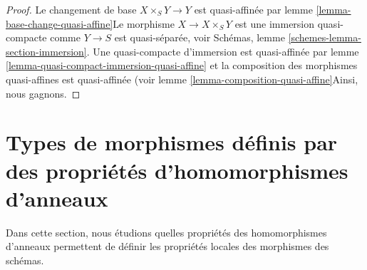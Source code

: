 \begin{proof}

Le changement de base $X \times_S Y \to Y$ est quasi-affinée par lemme \ref{lemma-base-change-quasi-affine}Le morphisme $X \to X \times_S Y$ est une immersion quasi-compacte comme $Y \to S$ est quasi-séparée, voir Schémas, lemme \ref{schemes-lemma-section-immersion}. Une quasi-compacte d'immersion est quasi-affinée par lemme \ref{lemma-quasi-compact-immersion-quasi-affine}
et la composition des morphismes quasi-affines est quasi-affinée (voir lemme \ref{lemma-composition-quasi-affine}Ainsi, nous gagnons.

\end{proof}











\section{Types de morphismes définis par des propriétés d'homomorphismes d'anneaux}
\label{section-properties-ring-maps}

\noindent
Dans cette section, nous étudions quelles propriétés des homomorphismes d'anneaux permettent de définir les propriétés locales des morphismes des schémas.

